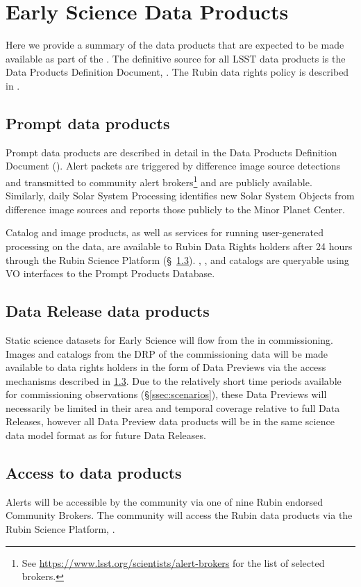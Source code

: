 \section{Early Science Data Products} 
\label{sec:data}

Here we provide a summary of the data products that are expected to be made available as part of the \esp. 
The definitive source for all LSST data products is the Data Products Definition Document, \citep{LSE-163}.
The Rubin data rights policy is described in  \cite{RDO-013}.

\subsection{Prompt data products}

Prompt data products are described in detail in the Data Products Definition Document (\DPDD).
Alert packets are triggered by difference image source detections and transmitted to community alert brokers\footnote{See \url{https://www.lsst.org/scientists/alert-brokers} for the list of selected brokers.} and are publicly available. 
Similarly, daily Solar System Processing identifies new Solar System Objects from difference image sources and reports those publicly to the Minor Planet Center.

Catalog and image products, as well as services for running user-generated processing on the data, are available to Rubin Data Rights holders after 24 hours through the Rubin Science Platform (\S~\ref{ssec:dataaccess}).
\DIASource, \DIAObject, and \SSObject catalogs are queryable using VO interfaces to the Prompt Products Database.

\subsection{Data Release data products}
Static science datasets for Early Science will flow from the \svs in commissioning.
Images and catalogs from the DRP of the commissioning data will be made available to data rights holders in the form of Data Previews via the access mechanisms described in \ref{ssec:dataaccess}.
Due to the relatively short time periods available for commissioning observations (\S \ref{ssec:scenarios}), these Data Previews will necessarily be limited in their area and temporal coverage relative to full Data Releases, however all Data Preview data products will be in the same science data model format as for future Data Releases.

\subsection{Access to \es data products}\label{ssec:dataaccess}
Alerts will be accessible by the community via one of nine Rubin endorsed Community Brokers. 
The community will access the Rubin data products via the Rubin Science Platform, \citep{LSE-319}.


